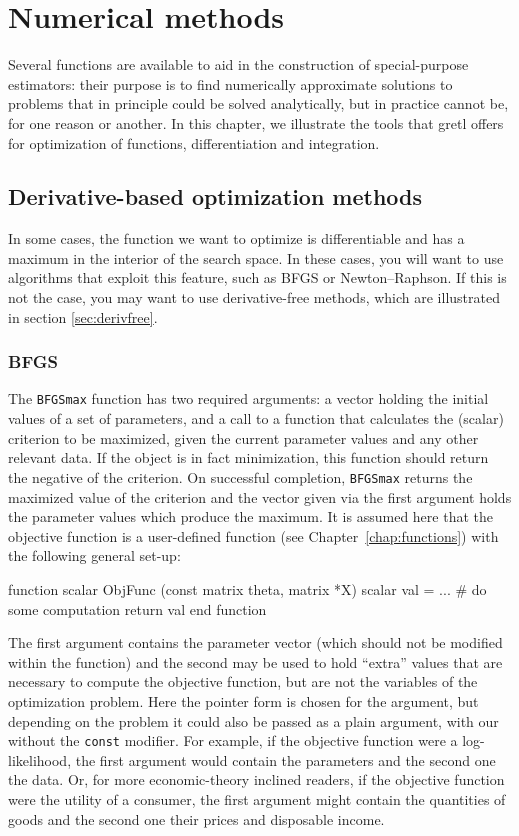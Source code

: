 \chapter{Numerical methods}
\label{chap:numerical}

Several functions are available to aid in the construction of
special-purpose estimators: their purpose is to find numerically
approximate solutions to problems that in principle could be solved
analytically, but in practice cannot be, for one reason or another. In
this chapter, we illustrate the tools that gretl offers for
optimization of functions, differentiation and integration.

\section{Derivative-based optimization methods}

In some cases, the function we want to optimize is differentiable and
has a maximum in the interior of the search space. In these cases, you
will want to use algorithms that exploit this feature, such as BFGS or
Newton--Raphson. If this is not the case, you may want to use
derivative-free methods, which are illustrated in section \ref{sec:derivfree}.

\subsection{BFGS}
\label{sec:BFGSmax}

The \texttt{BFGSmax} function has two required arguments: a vector
holding the initial values of a set of parameters, and a call to a
function that calculates the (scalar) criterion to be maximized, given
the current parameter values and any other relevant data.  If the
object is in fact minimization, this function should return the
negative of the criterion.  On successful completion, \texttt{BFGSmax}
returns the maximized value of the criterion and the vector given via
the first argument holds the parameter values which produce the
maximum.  It is assumed here that the objective function is a
user-defined function (see Chapter~\ref{chap:functions}) with the
following general set-up:
%
\begin{code}
function scalar ObjFunc (const matrix theta, matrix *X)
  scalar val = ...  # do some computation
  return val
end function
\end{code}

The first argument contains the parameter vector (which should not be
modified within the function) and the second may be used to hold
``extra'' values that are necessary to compute the objective function,
but are not the variables of the optimization problem. Here the pointer 
form is chosen for the argument, but depending on the problem it could
also be passed as a plain argument, with our without the \texttt{const} 
modifier. For example, if
the objective function were a log-likelihood, the first argument would
contain the parameters and the second one the data. Or, for more
economic-theory inclined readers, if the objective function were the
utility of a consumer, the first argument might contain the quantities
of goods and the second one their prices and disposable income.

